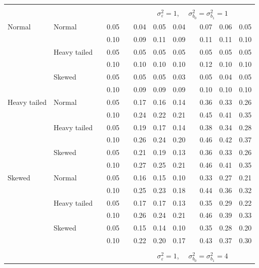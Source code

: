 \documentclass[12pt]{article} %
\begin{document}
\begin{table}[ht]
\begin{scriptsize}
\begin{center}
\begin{tabular}{ll p{.1cm} c p{.1cm} rrr p{.1cm} rrr}
&&&&&&&&&&&\\
& && && \multicolumn{7}{c}{$\sigma_{\varepsilon}^2 = 1$, \ \ $\sigma_{b_0}^2 = \sigma_{b_1}^2 = 1$} \\ \cline{6-12}
Normal       & Normal       && 0.05 &&   0.04 & 0.05 & 0.04 && 0.07 & 0.06 & 0.05 \\ 
             &              && 0.10 &&   0.09 & 0.11 & 0.09 && 0.11 & 0.11 & 0.10 \\ 
             & Heavy tailed && 0.05 &&   0.05 & 0.05 & 0.05 && 0.05 & 0.05 & 0.05 \\ 
             &              && 0.10 &&   0.10 & 0.10 & 0.10 && 0.12 & 0.10 & 0.10 \\ 
             & Skewed       && 0.05 &&   0.05 & 0.05 & 0.03 && 0.05 & 0.04 & 0.05 \\ 
             &              && 0.10 &&   0.09 & 0.09 & 0.09 && 0.10 & 0.10 & 0.10 \\ 
Heavy tailed & Normal       && 0.05 &&   0.17 & 0.16 & 0.14 && 0.36 & 0.33 & 0.26 \\ 
             &              && 0.10 &&   0.24 & 0.22 & 0.21 && 0.45 & 0.41 & 0.35 \\ 
             & Heavy tailed && 0.05 &&   0.19 & 0.17 & 0.14 && 0.38 & 0.34 & 0.28 \\ 
             &              && 0.10 &&   0.26 & 0.24 & 0.20 && 0.46 & 0.42 & 0.37 \\ 
             & Skewed       && 0.05 &&   0.21 & 0.19 & 0.13 && 0.36 & 0.33 & 0.26 \\ 
             &              && 0.10 &&   0.27 & 0.25 & 0.21 && 0.46 & 0.41 & 0.35 \\ 
Skewed       & Normal       && 0.05 &&   0.16 & 0.15 & 0.10 && 0.33 & 0.27 & 0.21 \\ 
             &              && 0.10 &&   0.25 & 0.23 & 0.18 && 0.44 & 0.36 & 0.32 \\ 
             & Heavy tailed && 0.05 &&   0.17 & 0.17 & 0.13 && 0.35 & 0.29 & 0.22 \\ 
             &              && 0.10 &&   0.26 & 0.24 & 0.21 && 0.46 & 0.39 & 0.33 \\ 
             & Skewed       && 0.05 &&   0.15 & 0.14 & 0.10 && 0.35 & 0.28 & 0.20 \\ 
             &              && 0.10 &&   0.22 & 0.20 & 0.17 && 0.43 & 0.37 & 0.30 \\ 


&&&&&&&&&&&\\
& && && \multicolumn{7}{c}{$\sigma_{\varepsilon}^2 = 1$, \ \ $\sigma_{b_0}^2 = \sigma_{b_1}^2 = 4$} \\ \cline{6-12}

\hline
\end{tabular}
\end{center}
\end{scriptsize}
\end{table}
\end{document}

